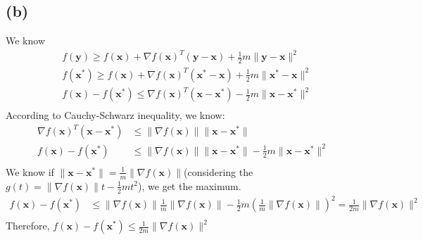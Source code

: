 \documentclass{article}
\begin{document}
\subsection*{(b)}
We know
\begin{align*}
    &f(\bm{y}) \geq f(\bm{x}) + \nabla f(\bm{x})^T (\bm{y} - \bm{x}) + \frac{1}{2} m \|\bm{y} - \bm{x}\|^2  \\
    &f(\bm{x}^*) \geq f(\bm{x}) + \nabla f(\bm{x})^T (\bm{x}^* - \bm{x}) + \frac{1}{2} m \|\bm{x}^* - \bm{x}\|^2  \\
    &f(\bm{x}) - f(\bm{x}^*) \leq  \nabla f(\bm{x})^T (\bm{x} - \bm{x}^*) - \frac{1}{2} m \|\bm{x} - \bm{x}^*\|^2  \\
\end{align*}
According to Cauchy-Schwarz inequality, we know:
\begin{align*}
    \nabla f(\bm{x})^T (\bm{x} - \bm{x}^*) &\leq \|\nabla f(\bm{x})\| \|\bm{x} - \bm{x}^*\|  \\
    f(\bm{x}) - f(\bm{x}^*) &\leq  \|\nabla f(\bm{x})\| \|\bm{x} - \bm{x}^*\| - \frac{1}{2} m \|\bm{x} - \bm{x}^*\|^2  \\
\end{align*}
We know if \(\|\bm{x} - \bm{x}^*\| = \frac{1}{m} \|\nabla f(\bm{x})\|\)(considering the \(g(t) = \|\nabla f(\bm{x})\| t - \frac{1}{2} m t^2\)), we get the maximum.
\begin{align*}
    f(\bm{x}) - f(\bm{x}^*) &\leq  \|\nabla f(\bm{x})\| \frac{1}{m} \|\nabla f(\bm{x})\| - \frac{1}{2} m (\frac{1}{m} \|\nabla f(\bm{x})\|)^2 = \frac{1}{2m} \|\nabla f(\bm{x})\|^2 \\
\end{align*}
Therefore, \( f(\bm{x}) - f(\bm{x}^*) \leq \frac{1}{2m} \|\nabla f(\bm{x})\|^2 \)
\end{document}
